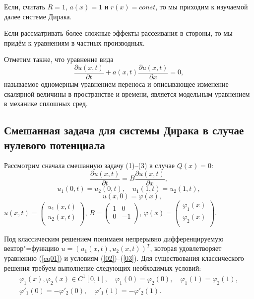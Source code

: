 Если, считать %
$R=1$,  $a(x)=1$ и $r(x)=const$, то мы приходим к изучаемой далее
системе Дирака.

 Если рассматривать более сложные эффекты
рассеивания в стороны, то мы придём к уравнениям в частных
производных.

Отметим также, что уравнение вида
$$\frac{\partial u(x,t)}{\partial t}+a(x,t)\frac{\partial u(x,t)}{\partial
x}=0,
$$
называемое одномерным уравнением переноса и описывающее изменение
скалярной величины в пространстве и времени, является модельным
уравнением в механике сплошных сред.




\subsection{ Смешанная задача для системы Дирака в случае нулевого потенциала}

Рассмотрим сначала смешанную задачу (1)--(3) в случае $Q(x)=0$:
\begin{equation}\label{eq01}
 \frac{\partial u(x,t)}{\partial t}= B\frac{\partial u(x,t)}{\partial x},
\end{equation}
 \begin{equation}
 \label{02}
 u_{1}(0,t)=u_{2}(0,t), \quad u_{1}(1,t)=u_{2}(1,t),
\end{equation}
\begin{equation}
 \label{03}
\quad u(x,0)= \varphi(x),
\end{equation}
%
 $u(x,t)=\begin{pmatrix}
  u_{1}(x,t) \\
  u_{2}(x,t) \\
\end{pmatrix}$, \quad $B=\begin{pmatrix}
  1 & 0 \\
  0 & -1 \\
\end{pmatrix}$, \quad
$\varphi(x)=\begin{pmatrix}
  \varphi_{1}(x)\\
  \varphi_{2}(x)\\
\end{pmatrix}$.

Под классическим решением понимаем  непрерывно дифференцируемую
вектор"=функцию $u=(u_{1}(x,t), u_{2}(x,t))^T$, которая
 удовлетворяет уравнению (\ref{eq01}) и условиям (\ref{02})--(\ref{03}).
Для существования классического решения  требуем выполнение
следующих необходимых условий:
\begin{equation}\label{fi-usl}
\begin{array}{c}
\varphi_{1}(x), \varphi_{2}(x) \in C^1[0,1], \quad
\varphi_{1}(0)=\varphi_{2}(0),  \quad \varphi_{1}(1)=\varphi_{2}(1),
\\
\varphi'_{1}(0)=- \varphi'_{2}(0),\quad
 \varphi'_{1}(1)=- \varphi'_{2}(1).
\end{array}
\end{equation}


